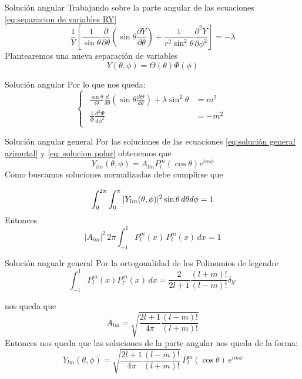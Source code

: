 \begin{frame}{Solución angular}
	Trabajando sobre la parte angular de las ecuaciones \ref{eq:separacion de variables RY}
	\[
		\frac{1}{Y}\left[ \frac{1}{\sin{\theta}} \frac{\partial}{\partial\theta} \left(\sin{\theta}\frac{\partial Y}{\partial\theta}\right)+ \frac{1}{r^2\sin^2\theta} \frac{\partial^2Y} {\partial\phi^2}\right] =-\lambda
	\]
	Plantearemos una nueva separación de variables
	\begin{equation}
		Y(\theta,\phi) = \Theta(\theta) \Phi(\phi)
		\label{eq:propuesta separacion de variables angulares}
	\end{equation}
\end{frame}

\begin{frame}{Solución angular}
	Por lo que nos queda:
	\begin{equation}
		\begin{cases}
			\begin{aligned}
			   \frac{\sin{\theta}}{\Theta}\frac{d}{d\theta} \left( \sin{\theta} \frac{d\Theta}{d\theta}\right)+\lambda \sin^2{\theta} &= m^2 \\
				\frac{1}{\Phi}\frac{d^2\Phi}{d\phi^2} &=-m^2
			\end{aligned}
		\end{cases}
    \label{eq:separacion de variables angular}
	\end{equation}
\end{frame}




\begin{frame}{Solución angular general}
	Por las soluciones de las ecuaciones \ref{eq:solución general azimutal} y \ref{eq: solucion polar} obtenemos que 
	\[ 
		Y_{lm}(\theta,\phi) = A_{lm} P_l^m(\cos\theta) e^{im\phi}
	\]
	Como buscamos soluciones normalizadas debe cumplirse que

	\begin{equation}
		\int_{0}^{2\pi}\int_{0}^{\pi}|Y_{lm}(\theta,\phi)|^2\sin{\theta}\,d\theta d\phi =1
		\label{eq:Normalidad de Y_{lm}}
	\end{equation}
	Entonces
	\[
		|A_{lm}|^2\, 2\pi \int_{-1}^{1} P_l^m(x) \,P_l^m(x)\,dx =1
	\]

\end{frame}
\begin{frame}{Solución angualr general}
	Por la ortogonalidad de los Polinomios de legendre 
	\[
		\int_{-1}^{1} P_l^m(x)P_{l'}^m(x)\,dx =\frac{2}{2l+1}\frac{(l+m)!}{(l-m)!}\delta_{ll'}
	\]

	nos queda que 
	\[
    	A_{lm} = \sqrt{\frac{2l+1}{4\pi}\frac{(l-m)!}{(l+m)!}}
	\]
	Entonces nos queda que las soluciones de la parte angular nos queda de la forma:
	\begin{equation}
		Y_{lm}(\theta,\phi)=\sqrt{\frac{2l+1}{4\pi}\frac{(l-m)!}{(l+m)!}}\,P_l^m(\cos\theta)\, e^{im\phi}
		\label{eq: ecuacion general angular normalizada}
	\end{equation}
\end{frame}
